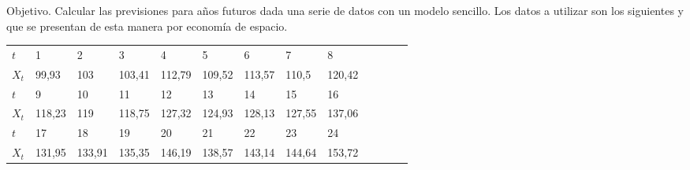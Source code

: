 Objetivo. Calcular las previsiones para años futuros dada una serie de
datos con un modelo sencillo.
Los datos a utilizar son los siguientes y que se presentan de esta
manera por economía de espacio.

\begin{table}
\centering
\begin{tabular}{|l|l|l|l|l|l|l|l|l|l|l|l|l|}
\hline
$t$   & 1 & 2 & 3 & 4 & 5 & 6 & 7 & 8 \\
$X_t$ & 99,93 & 103 & 103,41 & 112,79 & 109,52 & 113,57 & 110,5 & 120,42 \\
\hline
$t$   & 9 & 10 & 11 & 12 & 13 & 14 & 15 & 16 \\
$X_t$ & 118,23& 119 & 118,75 & 127,32 & 124,93 & 128,13 & 127,55 & 137,06\\
\hline
$t$   & 17 & 18 & 19 & 20 & 21 & 22 & 23 & 24\\
$X_t$ & 131,95 & 133,91 & 135,35 & 146,19 & 138,57 & 143,14 & 144,64 & 153,72\\
\hline
\end{tabular}
\end{table}


